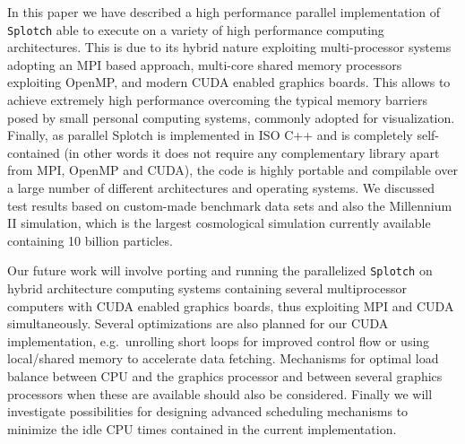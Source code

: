 \documentclass[1p,times]{elsarticle}
\begin{document}

In this paper we have described a high performance parallel implementation of {\tt Splotch} 
able to execute on a variety of high performance computing architectures. This is due 
to its hybrid nature exploiting multi-processor systems adopting an MPI based approach,
multi-core shared memory processors exploiting OpenMP, and modern CUDA enabled graphics 
boards. This allows to achieve extremely high performance overcoming the typical memory 
barriers posed by small personal computing systems, commonly adopted for visualization. 
Finally, as parallel Splotch is implemented in ISO C++ and is completely self-contained
(in other words it does not require any complementary library apart from MPI, OpenMP and CUDA), 
the code is highly portable and compilable over a large number of different 
architectures and operating systems. We discussed test results based on 
custom-made benchmark data sets and also the Millennium II simulation, which is the
largest cosmological simulation currently available containing 10 billion particles.

Our future work will involve porting and running the parallelized {\tt Splotch} on hybrid 
architecture computing systems containing several multiprocessor computers with CUDA 
enabled graphics boards, thus exploiting MPI and CUDA simultaneously. 
Several optimizations are also planned for our CUDA implementation, e.g.\ unrolling 
short loops for improved control flow or using local/shared memory to accelerate data fetching. 
Mechanisms for optimal load balance between CPU and the graphics processor and between several 
graphics processors when these are available should also be considered. Finally we will 
investigate possibilities for designing advanced scheduling mechanisms to minimize 
the idle CPU times contained in the current implementation.
\end{document}
